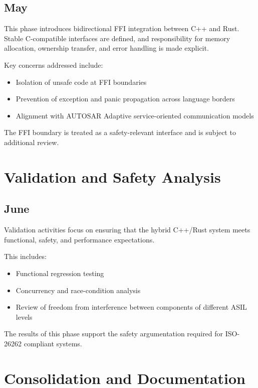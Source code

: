 \subsection*{May}

This phase introduces bidirectional \gls{FFI} integration between C++ and Rust.
Stable C-compatible interfaces are defined, and responsibility for memory
allocation, ownership transfer, and error handling is made explicit.

Key concerns addressed include:
\begin{itemize}
    \item Isolation of unsafe code at \gls{FFI} boundaries
    \item Prevention of exception and panic propagation across language borders
    \item Alignment with AUTOSAR Adaptive service-oriented communication models
\end{itemize}

The \gls{FFI} boundary is treated as a safety-relevant interface and is subject to
additional review.

\section{Validation and Safety Analysis}

\subsection*{June}

Validation activities focus on ensuring that the hybrid C++/Rust system meets
functional, safety, and performance expectations.

This includes:
\begin{itemize}
    \item Functional regression testing
    \item Concurrency and race-condition analysis
    \item Review of freedom from interference between components of different
    \gls{ASIL} levels
\end{itemize}

The results of this phase support the safety argumentation required for
ISO-26262 compliant systems.

\section{Consolidation and Documentation}

